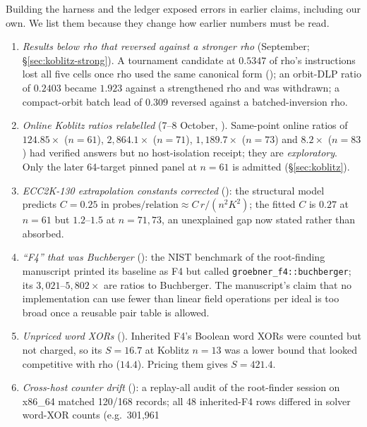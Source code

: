 Building the harness and the ledger exposed errors in earlier claims,
including our own. We list them because they change how earlier numbers
must be read.
\begin{enumerate}
\item \emph{Results below rho that reversed against a stronger rho}
  (September; \S\ref{sec:koblitz-strong}). A tournament candidate at
  $0.5347$ of rho's instructions lost all five cells once rho used the same
  canonical form (); an orbit-DLP
  ratio of $0.2403$ became $1.923$ against a strengthened rho and was
  withdrawn; a compact-orbit batch lead of $0.309$ reversed against a
  batched-inversion rho.
\item \emph{Online Koblitz ratios relabelled} (7--8 October,
  ). Same-point online
  ratios of $124.85\times$ ($n=61$), $2{,}864.1\times$ ($n=71$),
  $1{,}189.7\times$ ($n=73$) and $8.2\times$ ($n=83$) had verified answers
  but no host-isolation receipt; they are \emph{exploratory}. Only the
  later 64-target pinned panel at $n=61$ is admitted (\S\ref{sec:koblitz}).
\item \emph{ECC2K-130 extrapolation constants corrected}
  (): the structural model
  predicts $C=0.25$ in $\text{probes/relation}\approx C\,r/(n^2K^2)$; the
  fitted $C$ is $0.27$ at $n=61$ but $1.2$--$1.5$ at $n=71,73$, an
  unexplained gap now stated rather than absorbed.
\item \emph{``F4'' that was Buchberger}
  (): the
  NIST benchmark of the root-finding manuscript printed its baseline as F4
  but called \texttt{groebner\_f4::buchberger}; its $3{,}021$--$5{,}802\times$
  are ratios to Buchberger. The manuscript's claim that no implementation
  can use fewer than linear field operations per ideal is too broad once a
  reusable pair table is allowed.
\item \emph{Unpriced word XORs} ().
  Inherited F4's Boolean word XORs were counted but not charged, so its
  $S=16.7$ at Koblitz $n=13$ was a lower bound that looked competitive
  with rho ($14.4$). Pricing them gives $S=421.4$.
\item \emph{Cross-host counter drift}
  (): a replay-all audit
  of the root-finder session on x86\_64 matched 120/168 records; all 48
  inherited-F4 rows differed in solver word-XOR counts (e.g.\ 301{,}961

\end{enumerate}
